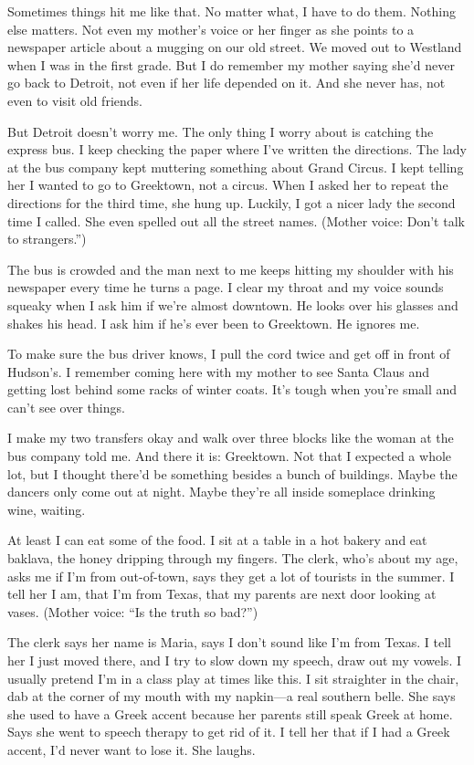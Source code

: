 \documentclass[
]{article}
\begin{document}
Sometimes things hit me like that. No matter what, I have to do them.
Nothing else matters. Not even my mother's voice or her finger as she
points to a newspaper article about a mugging on our old street. We
moved out to Westland when I was in the first grade. But I do remember
my mother saying she'd never go back to Detroit, not even if her life
depended on it. And she never has, not even to visit old friends.

But Detroit doesn't worry me. The only thing I worry about is catching
the express bus. I keep checking the paper where I've written the
directions. The lady at the bus company kept muttering something about
Grand Circus. I kept telling her I wanted to go to Greektown, not a
circus. When I asked her to repeat the directions for the third time,
she hung up. Luckily, I got a nicer lady the sec­ond time I called. She
even spelled out all the street names. (Mother voice: Don't talk to
strangers.'')

The bus is crowded and the man next to me keeps hitting my shoulder with
his newspaper every time he turns a page. I clear my throat and my voice
sounds squeaky when I ask him if we're almost downtown. He looks over
his glasses and shakes his head. I ask him if he's ever been to
Greek­town. He ignores me.

To make sure the bus driver knows, I pull the cord twice and get off in
front of Hudson's. I remember coming here with my mother to see Santa
Claus and getting lost behind some racks of winter coats. It's tough
when you're small and can't see over things.

I make my two transfers okay and walk over three blocks like the woman
at the bus company told me. And there it is: Greektown. Not that I
expected a whole lot, but I thought there'd be some­thing besides a
bunch of buildings. Maybe the dancers only come out at night. Maybe
they're all inside someplace drinking wine, waiting.

At least I can eat some of the food. I sit at a table in a hot bakery
and eat baklava, the honey dripping through my fingers. The clerk, who's
about my age, asks me if I'm from out-of-town, says they get a lot of
tourists in the summer. I tell her I am, that I'm from Texas, that my
parents are next door looking at vases. (Mother voice: ``Is the truth so
bad?'')

The clerk says her name is Maria, says I don't sound like I'm from
Texas. I tell her I just moved there, and I try to slow down my speech,
draw out my vowels. I usually pretend I'm in a class play at times like
this. I sit straighter in the chair, dab at the corner of my mouth with
my napkin---a real southern belle. She says she used to have a Greek
accent because her parents still speak Greek at home. Says she went to
speech therapy to get rid of it. I tell her that if I had a Greek
accent, I'd never want to lose it. She laughs.
\end{document}
